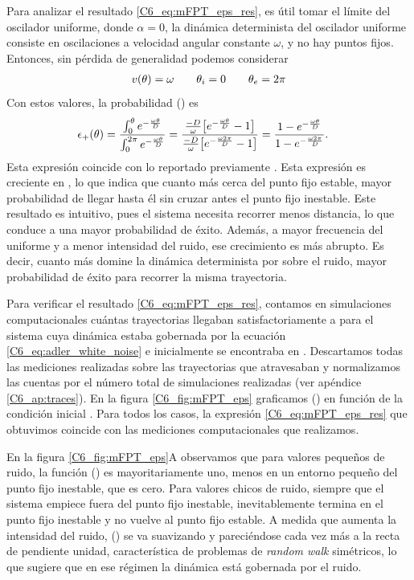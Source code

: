 \documentclass[./main.tex]{subfiles}
\begin{document}
Para analizar el resultado \ref{C6_eq:mFPT_eps_res}, es útil tomar el límite del oscilador uniforme, donde $\alpha = 0$, la dinámica determinista del oscilador uniforme consiste en oscilaciones a velocidad angular constante $\omega$, y no hay puntos fijos. Entonces, sin pérdida de generalidad podemos considerar
\begin{align}
    v(\theta) = \omega \qquad 
    \theta_i = 0 \qquad \theta_e = 2 \pi
    \label{C6_eq:mFPT_uniforme}
\end{align}
Con estos valores, la probabilidad \epsplus(\xx) es
\begin{align}
     \epsilon_{+}(\theta) & = \frac{\int_{0}^\theta e^{- \frac{\omega \theta}{D}}}{\int_{0}^{2\pi} e^{- \frac{\omega \theta}{D}}}
      = \frac{\frac{-D}{\omega} \big[e^{- \frac{\omega \theta}{D}} - 1\big]}{\frac{-D}{\omega} \big[e^{- \frac{\omega 2\pi}{D}} - 1\big]} = \frac{ 1 - e^{- \frac{\omega \theta}{D}}}{1- e^{- \frac{\omega 2\pi}{D}}}.
\end{align}
Esta expresión coincide con lo reportado previamente \cite{Redner2001}. Esta expresión es creciente en \xx, lo que indica que cuanto más cerca del punto fijo estable, mayor probabilidad de llegar hasta él sin cruzar antes el punto fijo inestable. Este resultado es intuitivo, pues el sistema necesita recorrer menos distancia, lo que conduce a una mayor probabilidad de éxito. Además, a mayor frecuencia del uniforme y a menor intensidad del ruido, ese crecimiento es más abrupto. Es decir, cuanto más domine la dinámica determinista por sobre el ruido, mayor probabilidad de éxito para recorrer la misma trayectoria. 


Para verificar el resultado \ref{C6_eq:mFPT_eps_res}, contamos en simulaciones computacionales cuántas trayectorias llegaban satisfactoriamente a \xxe para el sistema cuya dinámica estaba gobernada por la ecuación \ref{C6_eq:adler_white_noise} e inicialmente se encontraba en \xx. Descartamos todas las mediciones realizadas sobre las trayectorias que atravesaban \xxi y normalizamos las cuentas por el número total de simulaciones realizadas (ver apéndice \ref{C6_ap:traces}). En la figura \ref{C6_fig:mFPT_eps} graficamos \epsplus(\xx) en función de la condición inicial \xx. Para todos los casos, la expresión \ref{C6_eq:mFPT_eps_res} que obtuvimos coincide con las mediciones computacionales que realizamos.


En la figura \ref{C6_fig:mFPT_eps}A observamos que para valores pequeños de ruido, la función \epsplus(\xx) es mayoritariamente uno, menos en un entorno pequeño del punto fijo inestable, que es cero. Para valores chicos de ruido, siempre que el sistema empiece fuera del punto fijo inestable, inevitablemente termina en el punto fijo inestable y no vuelve al punto fijo estable. A medida que aumenta la intensidad del ruido, \epsplus(\xx) se va suavizando y pareciéndose cada vez más a la recta de pendiente unidad, característica de problemas de \textit{random walk} simétricos, lo que sugiere que en ese régimen la dinámica está gobernada por el ruido. 
\end{document}
